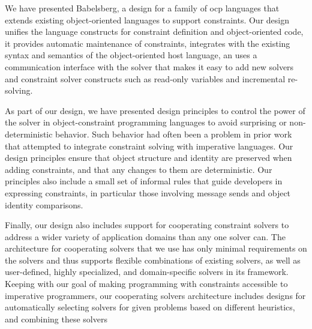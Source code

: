 We have presented Babelsberg, a design for a family of \acrlong{ocp} languages
that extends existing object-oriented languages to support constraints. Our
design unifies the language constructs for constraint definition and
object-oriented code, it provides automatic maintenance of constraints,
integrates with the existing syntax and semantics of the object-oriented host
language, an uses a communication interface with the solver that makes it easy
to add new solvers and constraint solver constructs such as read-only variables
and incremental re-solving.

As part of our design, we have presented design principles to control the power
of the solver in object-constraint programming languages to avoid surprising or
non-deterministic behavior. Such behavior had often been a problem in prior work
that attempted to integrate constraint solving with imperative languages. Our
design principles ensure that object structure and identity are preserved when
adding constraints, and that any changes to them are deterministic. Our
principles also include a small set of informal rules that guide developers in
expressing constraints, in particular those involving message sends and object
identity comparisons.

Finally, our design also includes support for cooperating constraint solvers to
address a wider variety of application domains than any one solver can. The
architecture for cooperating solvers that we use has only minimal requirements
on the solvers and thus supports flexible combinations of existing solvers, as
well as user-defined, highly specialized, and domain-specific solvers in its
framework. Keeping with our goal of making programming with constraints
accessible to imperative programmers, our cooperating solvers architecture
includes designs for automatically selecting solvers for given problems based on
different heuristics, and combining these solvers

